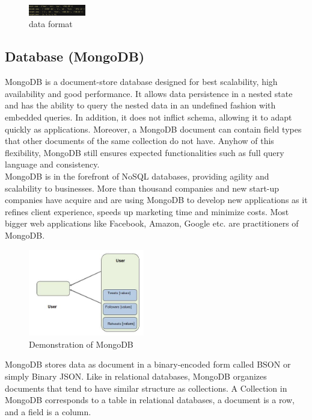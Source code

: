 \documentclass[conference]{IEEEtran}
\begin{document}
\begin{figure}[!ht]
	\centering
	\includegraphics[width=0.222\textwidth]{data_format.png}
	\caption{data format}
\end{figure}


\subsection{\textbf{Database (MongoDB)}}
MongoDB is a document-store database designed for best scalability, high availability and good performance. It allows data persistence in a nested state and has the ability to query the nested data in an undefined fashion with embedded queries. In addition, it does not inflict schema, allowing it to adapt quickly as applications. Moreover, a MongoDB document can contain field types that other documents of the same collection do not have. Anyhow of this flexibility, MongoDB still ensures expected functionalities such as full query language and consistency.\\
MongoDB is in the forefront of NoSQL databases, providing agility and scalability to businesses. More than thousand companies and new start-up companies have acquire and are using MongoDB to develop new applications as it refines client experience, speeds up marketing time and minimize costs. Most bigger web applications like Facebook, Amazon, Google etc. are practitioners of MongoDB. \\

\begin{figure}[!ht]
	\centering
	\includegraphics[width=0.45\textwidth]{mongo.png}
	\caption{Demonstration of MongoDB\cite{b7}}
\end{figure}

MongoDB stores data as document in a binary-encoded form called BSON or simply Binary JSON. Like in relational databases, MongoDB organizes documents that tend to have similar structure as collections. A Collection in MongoDB corresponds to a table in relational databases, a document is a row, and a field is a column.\\
\end{document}
